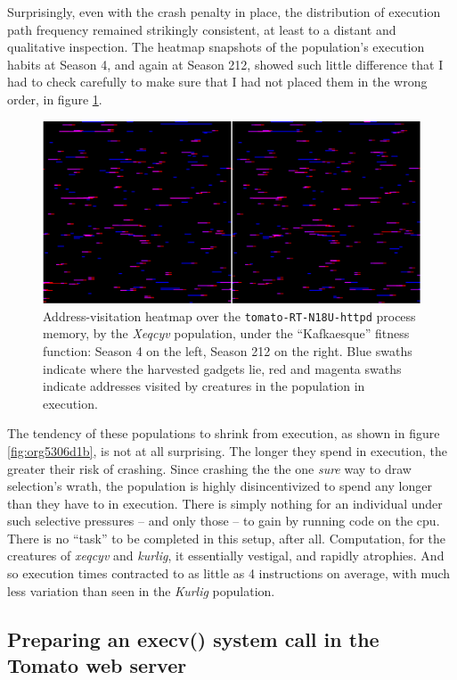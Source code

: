 \documentclass[12pt,glossary]{dalthesis}
\begin{document}
Surprisingly, even with the crash penalty in place, the distribution of execution
path frequency remained strikingly consistent, at least to a distant and qualitative
inspection. The heatmap snapshots of the population's execution habits at Season 4,
and again at Season 212, showed such little difference that I had to check carefully
to make sure that I had not placed them in the wrong order, in figure
\ref{fig:orgd70183c}. 

\begin{figure}[htbp]
\centering
\includegraphics[width=.9\linewidth]{../images/plots/xeqcyv_kafka_heatmap_beginning_end.pdf}
\caption{\label{fig:orgd70183c}
Address-visitation heatmap over the \texttt{tomato-RT-N18U-httpd} process memory, by the \emph{Xeqcyv} population, under the ``Kafkaesque'' fitness function: Season 4 on the left, Season 212 on the right. Blue swaths indicate where the harvested gadgets lie, red and magenta swaths indicate addresses visited by creatures in the population in execution.}
\end{figure}


The tendency of these populations to shrink from execution, as shown in figure
\ref{fig:org5306d1b}, is not at all surprising. The longer they spend in
execution, the greater their risk of crashing. Since crashing the the one \emph{sure}
way to draw selection's wrath, the population is highly disincentivized to spend
any longer than they have to in execution. There is simply nothing for an
individual under such selective pressures -- and only those -- to gain by
running code on the \gls{cpu}. There is no ``task'' to be completed in this setup,
after all. Computation, for the creatures of \emph{xeqcyv} and \emph{kurlig}, it essentially
vestigal, and rapidly atrophies. And so execution times contracted to as little
as 4 instructions on average, with much less variation than seen in the
\emph{Kurlig} population.

\subsection{Preparing an execv() system call in the Tomato web server}
\label{sec:orgb5ab01f}
\label{orgc694024}
\end{document}
